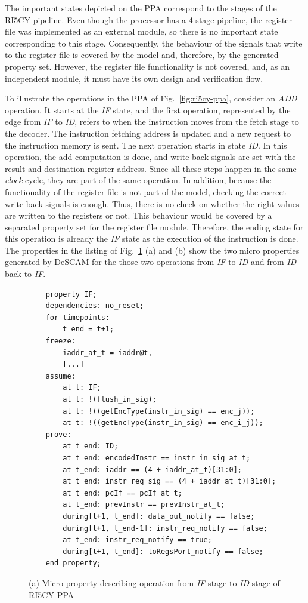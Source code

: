 The important states depicted on the PPA correspond to the stages of the RI5CY pipeline. Even though the processor has a 4-stage pipeline, the register file was implemented as an external module, so there is no important state corresponding to this stage. Consequently, the behaviour of the signals that write to the register file is covered by the model and, therefore, by the generated property set. However, the register file functionality is not covered, and, as an independent module, it must have its own design and verification flow.

To illustrate the operations in the PPA of Fig.~\ref{fig:ri5cy-ppa}, consider an \textit{ADD} operation. It starts at the \textit{IF} state, and the first operation, represented by the edge from \textit{IF} to \textit{ID}, refers to when the instruction moves from the fetch stage to the decoder. The instruction fetching address is updated and a new request to the instruction memory is sent. The next operation starts in state \textit{ID}. In this operation, the add computation is done, and write back signals are set with the result and destination register address. Since all these steps happen in the same \textit{clock} cycle, they are part of the same operation. In addition, because the functionality of the register file is not part of the model, checking the correct write back signals is enough. Thus, there is no check on whether the right values are written to the registers or not. This behaviour would be covered by a separated property set for the register file module. Therefore, the ending state for this operation is already the \textit{IF} state as the execution of the instruction is done. The properties in the listing of Fig.~\ref{fig:ri5cy-if-id-micro-ppt-a} (a) and (b) show the two micro properties generated by DeSCAM for the those two operations from \textit{IF} to \textit{ID} and from \textit{ID} back to \textit{IF}.

\begin{figure}[htb]
    \begin{lstlisting}
    property IF;
    dependencies: no_reset;
    for timepoints:
        t_end = t+1;
    freeze:
        iaddr_at_t = iaddr@t,
        [...]
    assume:
        at t: IF;
        at t: !(flush_in_sig);
        at t: !((getEncType(instr_in_sig) == enc_j));
        at t: !((getEncType(instr_in_sig) == enc_i_j));
    prove:
        at t_end: ID;
        at t_end: encodedInstr == instr_in_sig_at_t;
        at t_end: iaddr == (4 + iaddr_at_t)[31:0];
        at t_end: instr_req_sig == (4 + iaddr_at_t)[31:0];
        at t_end: pcIf == pcIf_at_t;
        at t_end: prevInstr == prevInstr_at_t;
        during[t+1, t_end]: data_out_notify == false;
        during[t+1, t_end-1]: instr_req_notify == false;
        at t_end: instr_req_notify == true;
        during[t+1, t_end]: toRegsPort_notify == false;
    end property;\end{lstlisting}
    \caption{(a) Micro property describing operation from \textit{IF} stage to \textit{ID} stage of RI5CY PPA}
    \label{fig:ri5cy-if-id-micro-ppt-a}
\end{figure}

